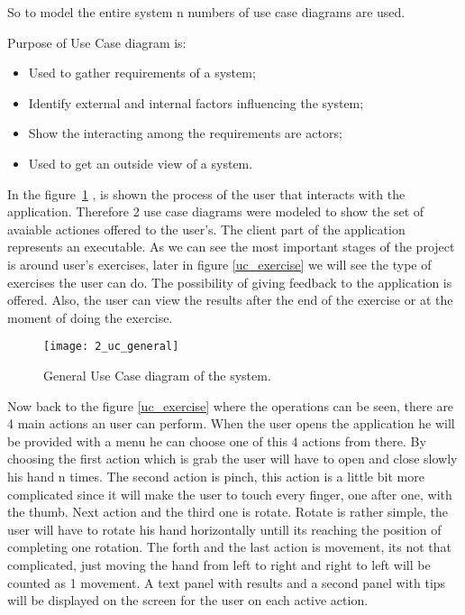 So to model the entire system n numbers of use case diagrams are used.

Purpose of Use Case diagram is:

\begin{itemize}
\item Used to gather requirements of a system;
\item Identify external and internal factors influencing the system;
\item Show the interacting among the requirements are actors;
\item Used to get an outside view of a system.

\end{itemize}
\vspace{0.2cm}


In the \mbox{figure \ref{uc_general}} , is shown the process of the user that interacts with the application. Therefore 2 use case diagrams were modeled to show the set of avaiable actiones offered to the user's. The client part of the application represents an executable. As we can see the most important stages of the project is around  user's exercises, later in \mbox{figure} \ref{uc_exercise} we will see the type of exercises the user can do. The possibility of giving feedback to the application is offered. Also, the user can view the results after the end of the exercise or at the moment of doing the exercise.


\begin{figure}[!h]
\centering
\texttt{[image: 2\_uc\_general]}
\caption{General Use Case diagram of the system.}\label{uc_general}
\end{figure}

Now back to the \mbox{figure} \ref{uc_exercise} where the operations can be seen, there are 4 main actions an user can perform. When the user opens the application he will be provided with a menu he can choose one of this 4 actions from there. By choosing the first action which is grab the user will have to open and close slowly his hand n times. The second action is pinch, this action is a little bit more complicated since it will make the user to touch every finger, one after one, with the thumb. Next action and the third one is rotate. Rotate is rather simple, the user will have to rotate his hand horizontally untill its reaching the position of completing one rotation. The forth and the last action is movement, its not that complicated, just moving the hand from left to right and right to left will be counted as 1 movement. A text panel with results and a second panel with tips will be displayed on the screen for the user on each active action.


